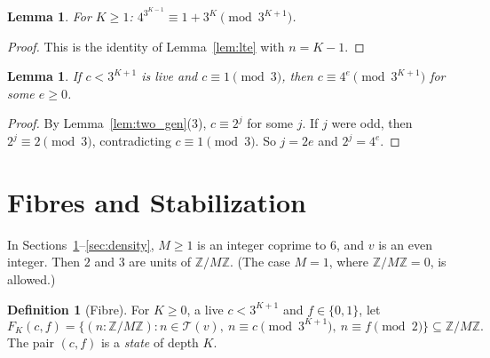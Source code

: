 \documentclass[11pt,reqno,oneside]{amsart}
\theoremstyle{plain}
\newtheorem{lemma}[theorem]{Lemma}
\theoremstyle{definition}
\newtheorem{definition}[theorem]{Definition}
\numberwithin{equation}{section}
\newcommand{\Z}{\mathbb{Z}}
\newcommand{\ZM}{\Z/M\Z}
\newcommand{\Tr}{\mathcal{T}}
\newcommand{\Fib}[3]{F_{#1}(#2,#3)}
\begin{document}
\begin{lemma}\label{lem:four_cong}
For $K\ge1$: $4^{3^{K-1}}\equiv1+3^K\pmod{3^{K+1}}$.
\end{lemma}
\begin{proof}
This is the identity of Lemma~\ref{lem:lte} with $n=K-1$.
\end{proof}

\begin{lemma}\label{lem:four_power}
If $c<3^{K+1}$ is live and $c\equiv1\pmod 3$, then $c\equiv4^e\pmod{3^{K+1}}$ for some $e\ge0$.
\end{lemma}
\begin{proof}
By Lemma~\ref{lem:two_gen}(3), $c\equiv2^j$ for some $j$. If $j$ were odd, then $2^j\equiv2\pmod 3$, contradicting $c\equiv1\pmod 3$. So $j=2e$ and $2^j=4^e$.
\end{proof}

\section{Fibres and Stabilization}\label{sec:fibres}
In Sections~\ref{sec:fibres}--\ref{sec:density}, $M\ge1$ is an integer coprime to $6$, and $v$ is an even integer. Then $2$ and $3$ are units of $\ZM$. (The case $M=1$, where $\ZM=0$, is allowed.)

\begin{definition}[Fibre]
For $K\ge0$, a live $c<3^{K+1}$ and $f\in\{0,1\}$, let
\[
\Fib Kcf=\bigl\{(n:\ZM) : n\in\Tr(v),\ n\equiv c\!\!\pmod{3^{K+1}},\ n\equiv f\!\!\pmod 2\bigr\}\subseteq\ZM.
\]
The pair $(c,f)$ is a \emph{state} of depth $K$.
\end{definition}
\end{document}
